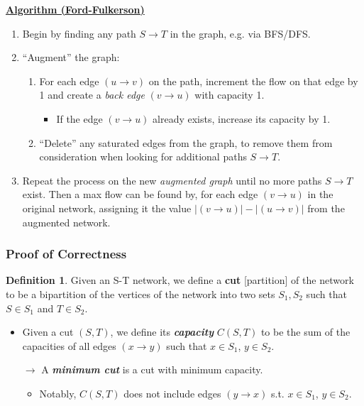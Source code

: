 \documentclass[12pt]{extarticle}
\theoremstyle{definition}
\newtheorem*{definition}{Definition}
\theoremstyle{remark}
\newcommand{\probtitle}[1]{\noindent \textbf{\ul{#1}}}
\begin{document}
\begin{tcolorbox}[colback=yellow!10!white]
    \probtitle{Algorithm (Ford-Fulkerson)}
    \begin{enumerate}
        \item Begin by finding any path $S\to T$ in the graph, e.g. via BFS/DFS.
        \item ``Augment'' the graph: \begin{enumerate}
            \item For each edge $(u\to v)$ on the path, increment the flow on that edge by 1 and create a \textit{back edge} $(v\to u)$ with capacity 1. \begin{itemize}
                \item If the edge $(v\to u)$ already exists, increase its capacity by 1.
            \end{itemize}
            \item ``Delete'' any saturated edges from the graph, to remove them from consideration when looking for additional paths $S\to T$.
        \end{enumerate}
        \item Repeat the process on the new \textit{augmented graph} until no more paths $S\to T$ exist. Then a max flow can be found by, for each edge $(v\to u)$ in the original network, assigning it the value $|(v\to u)|-|(u\to v)|$ from the augmented network.
    \end{enumerate}
\end{tcolorbox}

\subsubsection*{Proof of Correctness}
\begin{definition}
    Given an S-T network, we define a \textbf{cut} [partition] of the network to be a bipartition of the vertices of the network into two sets $S_1,S_2$ such that $S\in S_1$ and $T\in S_2$. \begin{itemize}
        \item Given a cut $(S,T)$, we define its \textbf{\textit{capacity}} $C(S,T)$ to be the sum of the capacities of all edges $(x\to y)$ such that $x\in S_1$, $y\in S_2$.
        
        $\rightarrow$ A \textbf{\textit{minimum cut}} is a cut with minimum capacity.\begin{itemize}
            \item Notably, $C(S,T)$ does not include edges $(y\to x)$ s.t. $x\in S_1$, $y\in S_2$.
        \end{itemize}
    \end{itemize}
\end{definition}
\end{document}
